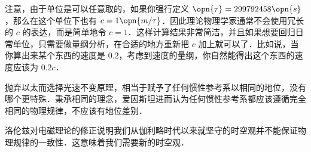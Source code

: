 注意，由于单位是可以任意取的，如果你强行定义 $\opn{\tau}=299792458\opn{s}$，那么在这个单位下也有 $c=1\opn{m/\tau}$．因此理论物理学家通常不会使用冗长的 $c$ 的表达，而是简单地令 $c=1$．这样计算结果非常简洁，并且如果想要回归日常单位，只需要做量纲分析，在合适的地方重新把 $c$ 加上就可以了．比如说，当你算出来某个东西的速度是 $0.2$，考虑到速度的量纲，你自然能得出这个东西的速度应该为 $0.2c$．

抛弃以太而选择光速不变原理，相当于赋予了任何惯性参考系以相同的地位，没有哪个更特殊．秉承相同的理念，爱因斯坦进而认为任何惯性参考系都应该遵循完全相同的物理规律，不应该有地位差别．

洛伦兹对电磁理论的修正说明我们从伽利略时代以来就坚守的时空观并不能保证物理规律的一致性．这意味着我们需要新的时空观．




